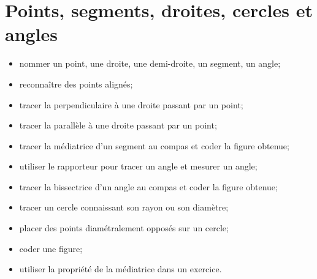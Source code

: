 \chapter{Points, segments, droites, cercles et angles}\label{ChDroitesAngles}
\begin{acquis}
\begin{itemize}
\item nommer un point, une droite, une demi-droite, un segment, un angle;
\item reconnaître des points alignés;
\item tracer la perpendiculaire à une droite passant par un point;
\item tracer la parallèle à une droite passant par un point;
\item tracer la médiatrice d’un segment au compas et coder la figure obtenue;
\item utiliser le rapporteur pour tracer un angle et mesurer un angle;
\item tracer la bissectrice d’un angle au compas et coder la figure obtenue;
\item tracer un cercle connaissant son rayon ou son diamètre;
\item placer des points diamétralement opposés sur un cercle;
\item coder une figure;
\item utiliser la propriété de la médiatrice dans un exercice.
\end{itemize}
\end{acquis} 

\activites


\cours


\exercicesbase
\begin{colonne*exercice}

\end{colonne*exercice}


\exercicesappr
\begin{colonne*exercice}

\end{colonne*exercice}

\connaissances


%

\pagebreak

\Recreation
%


